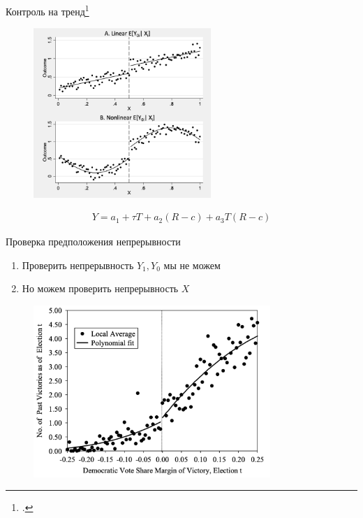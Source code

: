 \begin{frame}{Контроль на тренд\footcitetext[Глава 6]{angrist2008mostly}}

\begin{figure}
        \centering
        \includegraphics[width=0.6\textwidth]{Lecture_Sources/Images/rdd_trend_control.png}
    \end{figure}

\begin{gather*}
    Y = a_1 + \tau T + a_2 (R - c) + a_3 T (R - c)
\end{gather*}
    
\end{frame}

\begin{frame}{Проверка предположения непрерывности}
    \begin{enumerate}
        \item Проверить непрерывность $Y_1, Y_0$ мы не можем
        \item Но можем проверить непрерывность $X$
    \end{enumerate}
    \begin{figure}
        \centering
        \includegraphics[width=0.8\textwidth]{Images/rdd_placebo.png}
    \end{figure}
\end{frame}


